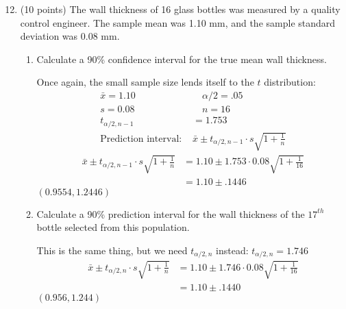 \documentclass[12pt, letter]{article}
\begin{document}
\begin{enumerate}
	\setcounter{enumi}{11}
	\item (10 points) The wall thickness of 16 glass bottles was measured by a quality control engineer. The sample mean was 1.10 mm, and the sample standard deviation was 0.08 mm.
	\begin{enumerate}
		\item Calculate a 90\% confidence interval for the true mean wall thickness.
		\begin{center}
			Once again, the small sample size lends itself to the $t$ distribution:
			\begin{align*}
			\bar{x} = 1.10 \quad & \quad \alpha/2 = .05 \\
			s = 0.08 \quad & \quad n = 16 \\
			t_{\alpha/2, n-1} &= 1.753 \\
			\text{Prediction interval: } & \bar{x} \pm t_{\alpha/2, n-1} \cdot s\sqrt{1 + \frac{1}{n}}
		\end{align*}
		\begin{align*}
			\bar{x} \pm t_{\alpha/2, n-1} \cdot s\sqrt{1 + \frac{1}{n}} &= 1.10 \pm 1.753 \cdot 0.08\sqrt{1 + \frac{1}{16}} \\
			&= 1.10 \pm .1446
		\end{align*}
		$\boxed{(0.9554, 1.2446)}$
		\end{center}
		
		\item Calculate a 90\% prediction interval for the wall thickness of the $17^{th}$ bottle selected from this population.
		\begin{center}
			This is the same thing, but we need $t_{\alpha/2, n}$ instead: $t_{\alpha/2, n} = 1.746$
			\begin{align*}
				\bar{x} \pm t_{\alpha/2, n} \cdot s\sqrt{1 + \frac{1}{n}} &= 1.10 \pm 1.746 \cdot 0.08\sqrt{1 + \frac{1}{16}} \\
				&= 1.10 \pm .1440
			\end{align*}
			$\boxed{(0.956, 1.244)}$
		\end{center}
	\end{enumerate}
\end{enumerate}
\end{document}
